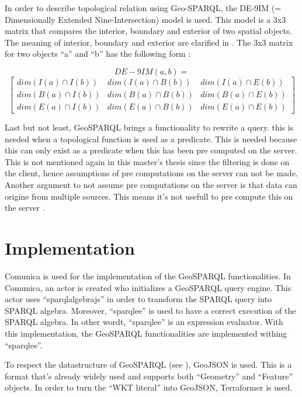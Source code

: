 \documentclass[twocolumn]{phdsymp} %
\begin{document}
In order to describe topological relation using Geo-SPARQL, the DE-9IM (= Dimensionally Extended Nine-Intersection) model is used. This model is a 3x3 matrix that compares the interior, boundary and exterior of two spatial objects. The meaning of interior, boundary and exterior are clarified in . The 3x3 matrix for two objects ``a'' and ``b'' has the following form \cite{shen2018classification}:

\begin{equation*}
    DE-9IM(a,b) = 
\end{equation*}
\begin{equation*}
    \begin{bmatrix}
        dim(I(a)\cap I(b)) & dim(I(a)\cap B(b)) & dim(I(a)\cap E(b))\\
        dim(B(a)\cap I(b)) & dim(B(a)\cap B(b)) & dim(B(a)\cap E(b))\\
        dim(E(a)\cap I(b)) & dim(E(a)\cap B(b)) & dim(E(a)\cap E(b))
    \end{bmatrix}
\end{equation*}

Last but not least, GeoSPARQL brings a functionality to rewrite a query. this is needed when a topological function is used as a predicate. This is needed because this can only exist as a predicate when this has been pre computed on the server. This is not mentioned again in this master's thesis since the filtering is done on the client, hence assumptions of pre computations on the server can not be made. Another argument to not assume pre computations on the server is that data can origine from multiple sources. This means it's not usefull to pre compute this on the server \cite{ogcdocs}.

\section{Implementation}
Comunica is used for the implementation of the GeoSPARQL functionalities. In Comunica, an actor is created who initializes a GeoSPARQL query engine. This actor uses ``sparqlalgebrajs'' in order to transform the SPARQL query into SPARQL algebra. Moreover, ``sparqlee'' is used to have a correct execution of the SPARQL algebra. In other wordt, ``sparqlee'' is an expression evaluator. With this implementation, the GeoSPARQL functionalities are implemented withing ``sparqlee''. 

To respect the datastructure of GeoSPARQL (see ), GeoJSON is used. This is a format that's already widely used and supports both ``Geometry'' and ``Feature'' objects. In order to turn the ``WKT literal'' into GeoJSON, Terraformer is used.
\end{document}
